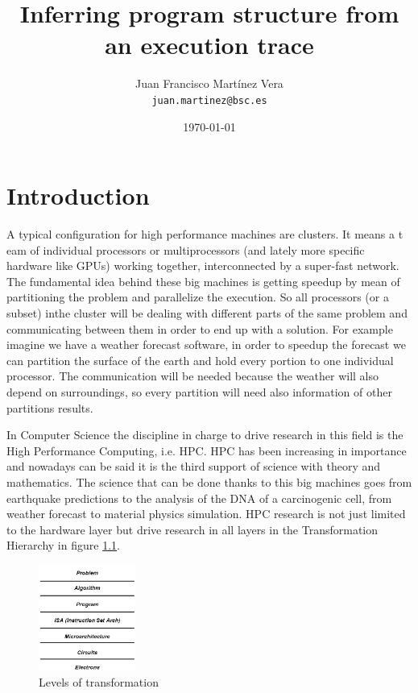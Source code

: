 \documentclass[12pt]{report}
\title{
  {\Huge Inferring program structure from an execution trace}
}
\author{
  {Juan Francisco Martínez Vera}\\
  {\tt juan.martinez@bsc.es}
}
\date{\today}
\begin{document}
\maketitle
\tableofcontents

\chapter{Introduction}
A typical configuration for high performance machines are clusters. It means a t
eam of individual processors or multiprocessors (and lately more specific 
hardware like GPUs) working together, interconnected by a super-fast network. 
The fundamental idea behind these big machines is getting speedup by mean of
partitioning the problem and parallelize the execution. So all processors (or a 
subset) inthe cluster will be dealing with different parts of the same problem 
and communicating between them in order to end up with a solution. For example 
imagine we have a weather forecast software, in order to speedup the forecast 
we can partition the surface of the earth and hold every portion to one individual
processor. The communication will be needed because the weather will also depend 
on surroundings, so every partition will need also information of other partitions 
results.

In Computer Science the discipline in charge to drive research in this field is 
the High Performance Computing, i.e. HPC. HPC has been increasing in importance 
and nowadays can be said it is the third support of science with theory and 
mathematics. The science that can be done thanks to this big machines goes from 
earthquake predictions to the analysis of the DNA of a carcinogenic cell, from
weather forecast to material physics simulation. HPC research is not just limited
to the hardware layer but drive research in all layers in the Transformation 
Hierarchy\cite{transformationHierarchy} in figure \ref{transformationHierarchyImg}.

\begin{figure}
  \caption{Levels of transformation}
  \label{transformationHierarchyImg}
  \centering
    \includegraphics[width=120px]{transformationhierarchy.png}
\end{figure}
\end{document}
